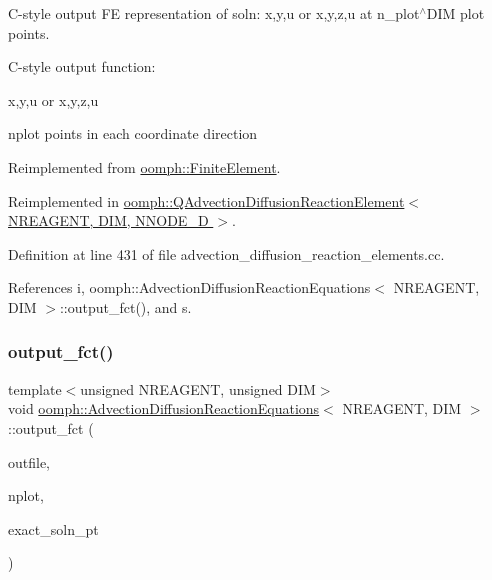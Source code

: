 C-\/style output FE representation of soln\+: x,y,u or x,y,z,u at n\+\_\+plot$^\wedge$\+D\+IM plot points. 

C-\/style output function\+:

x,y,u or x,y,z,u

nplot points in each coordinate direction 

Reimplemented from \hyperlink{classoomph_1_1FiniteElement_adfaee690bb0608f03320eeb9d110d48c}{oomph\+::\+Finite\+Element}.



Reimplemented in \hyperlink{classoomph_1_1QAdvectionDiffusionReactionElement_abd8dbb087ca525304f3328d823311d6f}{oomph\+::\+Q\+Advection\+Diffusion\+Reaction\+Element$<$ N\+R\+E\+A\+G\+E\+N\+T, D\+I\+M, N\+N\+O\+D\+E\+\_\+D $>$}.



Definition at line 431 of file advection\+\_\+diffusion\+\_\+reaction\+\_\+elements.\+cc.



References i, oomph\+::\+Advection\+Diffusion\+Reaction\+Equations$<$ N\+R\+E\+A\+G\+E\+N\+T, D\+I\+M $>$\+::output\+\_\+fct(), and s.

\mbox{\label{classoomph_1_1AdvectionDiffusionReactionEquations_af540c03c411843c566c81af918d620c2}} 
\subsubsection{\texorpdfstring{output\+\_\+fct()}{output\_fct()}\hspace{0.1cm}{\footnotesize\ttfamily [1/2]}}
{\footnotesize\ttfamily template$<$unsigned N\+R\+E\+A\+G\+E\+NT, unsigned D\+IM$>$ \\
void \hyperlink{classoomph_1_1AdvectionDiffusionReactionEquations}{oomph\+::\+Advection\+Diffusion\+Reaction\+Equations}$<$ N\+R\+E\+A\+G\+E\+NT, D\+IM $>$\+::output\+\_\+fct (\begin{DoxyParamCaption}\item[{std\+::ostream \&}]{outfile,  }\item[{const unsigned \&}]{nplot,  }\item[{\hyperlink{classoomph_1_1FiniteElement_a690fd33af26cc3e84f39bba6d5a85202}{Finite\+Element\+::\+Steady\+Exact\+Solution\+Fct\+Pt}}]{exact\+\_\+soln\+\_\+pt }\end{DoxyParamCaption})\hspace{0.3cm}{\ttfamily [virtual]}}



